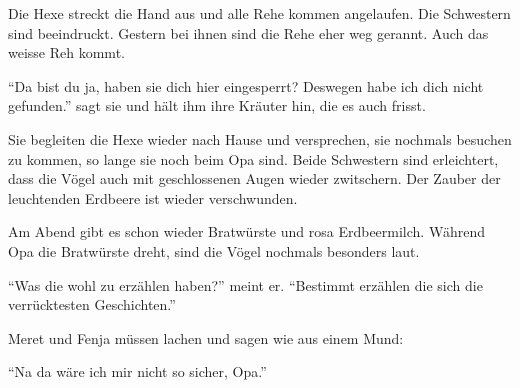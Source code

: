 Die Hexe streckt die Hand aus und alle Rehe kommen angelaufen. Die Schwestern sind beeindruckt. Gestern bei ihnen sind die Rehe eher weg gerannt. Auch das weisse Reh kommt.

\enquote{Da bist du ja, haben sie dich hier eingesperrt? Deswegen habe ich dich nicht gefunden.} sagt sie und hält ihm ihre Kräuter hin, die es auch frisst.

Sie begleiten die Hexe wieder nach Hause und versprechen, sie nochmals besuchen zu kommen, so lange sie noch beim Opa sind. Beide Schwestern sind erleichtert, dass die Vögel auch mit geschlossenen Augen wieder zwitschern. Der Zauber der leuchtenden Erdbeere ist wieder verschwunden.

Am Abend gibt es schon wieder Bratwürste und rosa Erdbeermilch. Während Opa die Bratwürste dreht, sind die Vögel nochmals besonders laut.

\enquote{Was die wohl zu erzählen haben?} meint er. \enquote{Bestimmt erzählen die sich die verrücktesten Geschichten.}

Meret und Fenja müssen lachen und sagen wie aus einem Mund:

\enquote{Na da wäre ich mir nicht so sicher, Opa.} \hfill {\color{red}\decofourleft}


